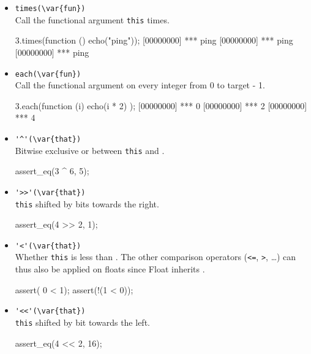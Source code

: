 \begin{itemize}
\item \lstinline|times(\var{fun})|\\
  Call the functional argument  \lstinline|this| times.

\begin{urbiscript}[firstnumber=last]
3.times(function () { echo("ping")});
[00000000] *** ping
[00000000] *** ping
[00000000] *** ping
\end{urbiscript}

\item \lstinline|each(\var{fun})|\\
  Call the functional argument  on every integer from 0 to
  target - 1.
\begin{urbiscript}[firstnumber=last]
3.each(function (i) { echo(i * 2) });
[00000000] *** 0
[00000000] *** 2
[00000000] *** 4
\end{urbiscript}

\item \lstinline|'^'(\var{that})|\\
  Bitwise exclusive or between \lstinline|this| and .
\begin{urbiscript}[firstnumber=last]
assert_eq(3 ^ 6, 5);
\end{urbiscript}

\item \lstinline|'>>'(\var{that})|\\%
  \lstinline|this| shifted by  bits towards the right.
\begin{urbiscript}[firstnumber=last]
assert_eq(4 >> 2, 1);
\end{urbiscript}

\item \lstinline|'<'(\var{that})|\\
  Whether \lstinline|this| is less than . The other comparison
  operators (\lstinline|<=|, \lstinline|>|, \ldots) can thus also be
  applied on floats since Float inherits .
\begin{urbiscript}[firstnumber=last]
assert(  0 < 1);
assert(!(1 < 0));
\end{urbiscript}

\item \lstinline|'<<'(\var{that})|\\
  \lstinline|this| shifted by  bit towards the left.
\begin{urbiscript}[firstnumber=last]
assert_eq(4 << 2, 16);
\end{urbiscript}


\end{itemize}
